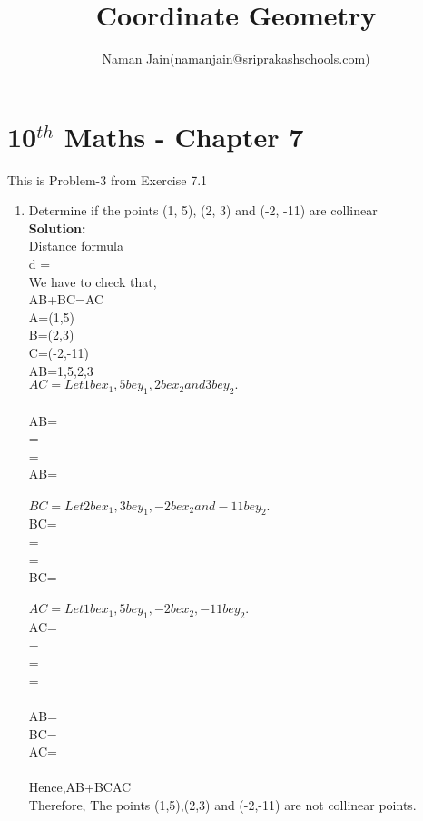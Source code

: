 \documentclass[12pt]{article}
\title{Coordinate Geometry}
\author{Naman Jain(namanjain@sriprakashschools.com)}
\newcommand{\solution}{\noindent \textbf{Solution: }}
\begin{document}
\maketitle
\section*{10$^{th}$ Maths - Chapter 7}
This is Problem-3 from Exercise 7.1
\begin{enumerate}
\item Determine if the points (1, 5), (2, 3) and (-2, -11) are collinear\\ 
\solution \\
Distance formula
\\d = \\

We have to check that,\\
AB+BC=AC\\

A=(1,5)\\
B=(2,3)\\
C=(-2,-11)\\

AB=1,5,2,3 \\
\begin{math} AC=Let 1 be x_1 , 5 be y_1 , 2 be x_2 and 3 be y_2. \end{math} \\ \\
AB= \\
= \\
= \\
AB= \\ \\ 
\begin{math}BC=Let 2 be x_1 , 3 be y_1 , -2 be x_2 and -11 be y_2. \end{math} \\
BC=\\
= \\
= \\
BC= \\ \\
\begin{math}AC=Let 1 be x_1 , 5 be y_1 , -2 be x_2 , -11 be y_2. \end{math} \\
AC=  \\
= \\
= \\
= \\ \\
AB= \\
BC= \\
AC= \\ \\
Hence,AB+BC\neq AC \\
Therefore, The points (1,5),(2,3) and (-2,-11) are not collinear points.

	

\end{enumerate}
\end{document}

